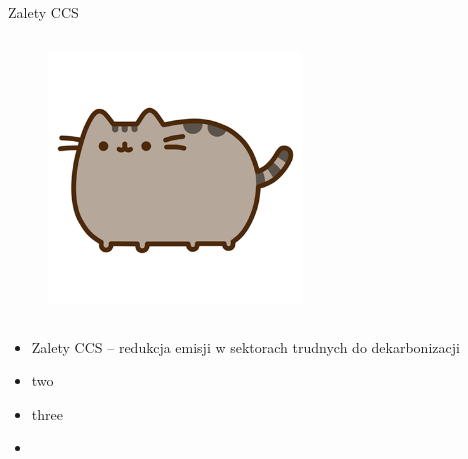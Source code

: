 \begin{columnframe}{Zalety CCS}
    \begin{column}{0.5\textwidth}
        \begin{figure}
            \centering
            \includegraphics[width=0.6\textwidth, frame]{images/pusheen.png}
        \end{figure}
    \end{column}
    \begin{column}{0.5\textwidth}
        \begin{itemize}
            \item Zalety CCS – redukcja emisji w sektorach trudnych do dekarbonizacji
            \item two \MeV
            \item three \GeV
            \item \aegis
        \end{itemize}
    \end{column}
\end{columnframe}


